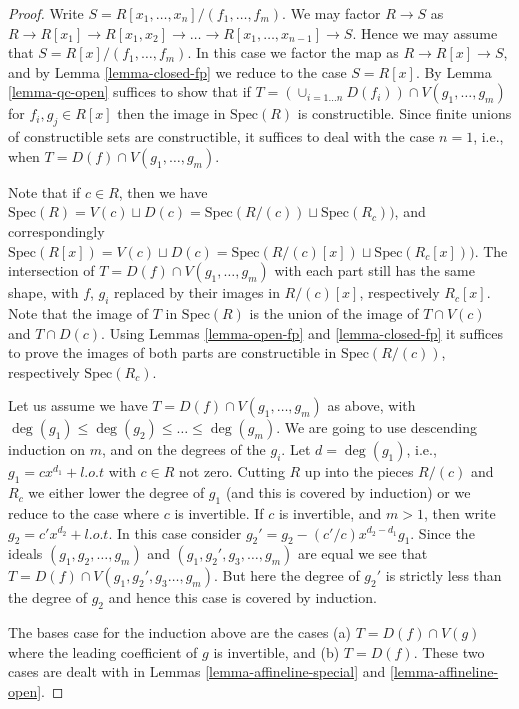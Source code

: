 \begin{proof}
Write $S = R[x_1,\ldots,x_n]/(f_1,\ldots,f_m)$.
We may factor $R \to S$ as $R \to R[x_1] \to R[x_1,x_2]
\to \ldots \to R[x_1,\ldots,x_{n-1}] \to S$. Hence 
we may assume that $S = R[x]/(f_1,\ldots,f_m)$.
In this case we factor the map as $R \to R[x] \to S$,
and by Lemma \ref{lemma-closed-fp} we reduce to
the case $S = R[x]$. By Lemma \ref{lemma-qc-open} suffices
to show that if
$T = (\cup_{i=1\ldots n} D(f_i)) \cap V(g_1,\ldots,g_m)$ 
for $f_i , g_j \in R[x]$ then the image in $\text{Spec}(R)$ is
constructible. Since finite unions of constructible sets
are constructible, it suffices to deal with the case $n=1$,
i.e., when $T = D(f) \cap V(g_1,\ldots,g_m)$.

\medskip\noindent
Note that if $c \in R$, then we have $\text{Spec}(R) =
V(c) \sqcup D(c) = \text{Spec}(R/(c)) \sqcup 
\text{Spec}(R_c))$, and correspondingly $\text{Spec}(R[x]) =
V(c) \sqcup D(c) = \text{Spec}(R/(c)[x]) \sqcup 
\text{Spec}(R_c[x]))$. The intersection of $T = D(f) \cap V(g_1,\ldots,g_m)$
with each part still has the same shape, with $f$, $g_i$ replaced
by their images in $R/(c)[x]$, respectively $R_c[x]$.
Note that the image of $T$
in $\text{Spec}(R)$ is the union of the image of
$T \cap V(c)$ and $T \cap D(c)$. Using Lemmas \ref{lemma-open-fp}
and \ref{lemma-closed-fp} it suffices to prove the images of both
parts are constructible in $\text{Spec}(R/(c))$, respectively
$\text{Spec}(R_c)$.

\medskip\noindent
Let us assume we have $T = D(f) \cap V(g_1,\ldots,g_m)$
as above, with $\deg(g_1) \leq \deg(g_2) \leq \ldots \leq \deg(g_m)$.
We are going to use descending induction on $m$, and on the 
degrees of the $g_i$. Let $d = \deg(g_1)$, i.e., $g_1 = c x^{d_1} + l.o.t$
with $c \in R$ not zero. Cutting $R$ up into the pieces
$R/(c)$ and $R_c$ we either lower the degree of $g_1$ (and this
is covered by induction)
or we reduce to the case where $c$ is invertible.
If $c$ is invertible, and $m > 1$, then write
$g_2 = c' x^{d_2} + l.o.t$. In this case consider
$g_2' = g_2 - (c'/c) x^{d_2 - d_1} g_1$. Since the ideals
$(g_1, g_2, \ldots, g_m)$ and $(g_1, g_2', g_3, \ldots, g_m)$
are equal we see that $T = D(f) \cap V(g_1,g_2',g_3\ldots,g_m)$.
But here the degree of $g_2'$ is strictly less than the degree
of $g_2$ and hence this case is covered by induction.

\medskip\noindent
The bases case for the induction above are the cases
(a) $T = D(f) \cap V(g)$ where the leading coefficient
of $g$ is invertible, and (b) $T = D(f)$. These two cases
are dealt with in Lemmas \ref{lemma-affineline-special}
and \ref{lemma-affineline-open}.
\end{proof}


